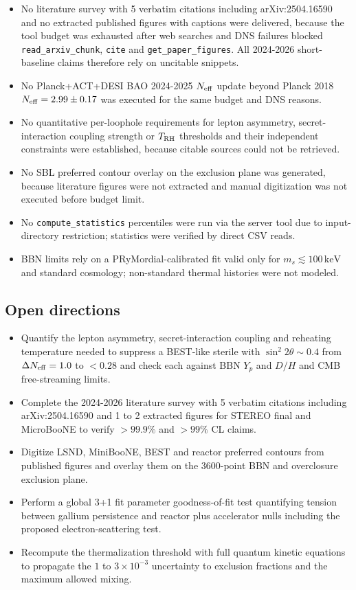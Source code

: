 \documentclass[11pt,a4paper]{article}
\begin{document}
\begin{itemize}
  \item No literature survey with 5 verbatim citations including arXiv:2504.16590 and no extracted published figures with captions were delivered, because the tool budget was exhausted after web searches and DNS failures blocked \texttt{read\_\allowbreak{}arxiv\_\allowbreak{}chunk}, \texttt{cite} and \texttt{get\_\allowbreak{}paper\_\allowbreak{}figures}. All 2024-2026 short-baseline claims therefore rely on uncitable snippets.
  \item No Planck+ACT+DESI BAO 2024-2025 $N_{\rm eff}$ update beyond Planck 2018 $N_{\rm eff} = 2.99 \pm 0.17$ was executed for the same budget and DNS reasons.
  \item No quantitative per-loophole requirements for lepton asymmetry, secret-interaction coupling strength or $T_{\rm RH}$ thresholds and their independent constraints were established, because citable sources could not be retrieved.
  \item No SBL preferred contour overlay on the exclusion plane was generated, because literature figures were not extracted and manual digitization was not executed before budget limit.
  \item No \texttt{compute\_\allowbreak{}statistics} percentiles were run via the server tool due to input-directory restriction; statistics were verified by direct CSV reads.
  \item BBN limits rely on a PRyMordial-calibrated fit valid only for $m_s \lesssim 100\,\mathrm{keV}$ and standard cosmology; non-standard thermal histories were not modeled.
\end{itemize}
\subsection{Open directions}
\begin{itemize}
  \item Quantify the lepton asymmetry, secret-interaction coupling and reheating temperature needed to suppress a BEST-like sterile with $\sin^2 2\theta \sim 0.4$ from $\Delta N_{\rm eff} = 1.0$ to $<0.28$ and check each against BBN $Y_p$ and $D/H$ and CMB free-streaming limits.
  \item Complete the 2024-2026 literature survey with 5 verbatim citations including arXiv:2504.16590 and 1 to 2 extracted figures for STEREO final and MicroBooNE to verify $>99.9\%$ and $>99\%$ CL claims.
  \item Digitize LSND, MiniBooNE, BEST and reactor preferred contours from published figures and overlay them on the 3600-point BBN and overclosure exclusion plane.
  \item Perform a global 3+1 fit parameter goodness-of-fit test quantifying tension between gallium persistence and reactor plus accelerator nulls including the proposed electron-scattering test.
  \item Recompute the thermalization threshold with full quantum kinetic equations to propagate the $1$ to $3 \times 10^{-3}$ uncertainty to exclusion fractions and the maximum allowed mixing.
\end{itemize}
\end{document}
